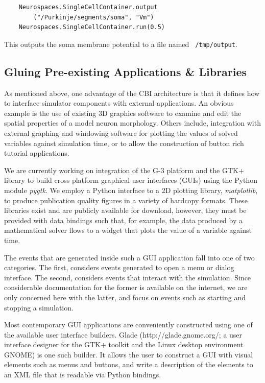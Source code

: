 \documentclass[10pt]{article}
\begin{document}
\begin{verbatim}
    Neurospaces.SingleCellContainer.output
        ("/Purkinje/segments/soma", "Vm")
    Neurospaces.SingleCellContainer.run(0.5)
\end{verbatim}

This outputs the soma membrane potential to a file named {\tt
  /tmp/output}.


\subsection*{Gluing Pre-existing Applications \& Libraries}

As mentioned above, one advantage of the CBI
architecture is that it defines how to interface simulator components
with external applications.  An obvious example is the use of existing
3D graphics software to examine and edit the spatial properties of a
model neuron morphology.  Others include, integration with external
graphing and windowing software for plotting the values of solved
variables against simulation time, or to allow the construction of
button rich tutorial applications.

We are currently working on integration of the G-3 platform and the
GTK+ library to build cross platform graphical user interfaces (GUIs) using the Python module {\it
  pygtk}. We employ a Python interface to a 2D plotting
library, {\it matplotlib}, to  produce publication quality figures in a variety of hardcopy
formats. These libraries exist and are publicly available for download,
however, they must be provided with data bindings such that, for
example, the data produced by a mathematical solver flows to a widget
that plots the value of a variable against time.

The events that are
generated inside such a GUI application fall into one of two
categories.  The first, considers events generated to open a menu or
dialog interface.  The second, considers events that interact with the
simulation.  Since considerable documentation for the former is available
on the internet, we are only concerned here with the latter, and focus on
events such as starting and stopping a simulation.

Most contemporary GUI applications are conveniently constructed using
one of the available user interface builders.  Glade
(http://glade.gnome.org/; a user interface designer for the GTK+
toolkit and the Linux desktop environment GNOME) is one such builder.
It allows the user to construct a GUI with visual elements such as
menus and buttons, and write a description of the elements to an XML
file that is readable via Python bindings.
\end{document}
